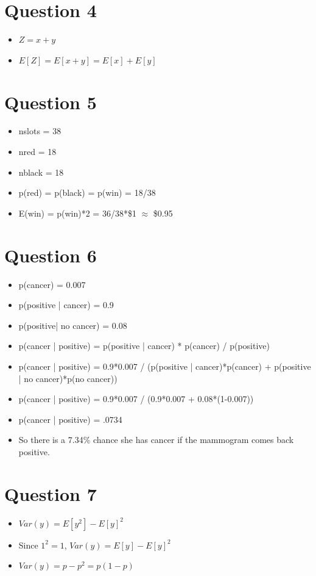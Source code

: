 \documentclass[12pt, letter]{article}
\begin{document}
\section{Question 4}%
\label{sec:question_4}
\begin{itemize}
	\item $Z = x+y$
	\item $E[Z] = E[x+y] = E[x]+E[y]$
\end{itemize}

\section{Question 5}%
\label{sec:question_5}
\begin{itemize}
	\item nslots = 38
	\item nred = 18
	\item nblack = 18
	\item p(red) = p(black) = p(win) = 18/38
	\item E(win) = p(win)*2 = 36/38*\$1 $\approx$ \$0.95
\end{itemize}

\section{Question 6}%
\label{sec:question_6}
\begin{itemize}
	\item p(cancer) = 0.007
	\item p(positive | cancer) = 0.9
	\item p(positive| no cancer) = 0.08
	\item p(cancer | positive) = p(positive | cancer) * p(cancer) / p(positive)
	\item p(cancer | positive) =  0.9*0.007 / (p(positive | cancer)*p(cancer) + p(positive | no cancer)*p(no cancer))
	\item p(cancer | positive) = 0.9*0.007 / (0.9*0.007 + 0.08*(1-0.007))
	\item p(cancer | positive) = .0734
	\item So there is a 7.34\% chance she has cancer if the mammogram comes back positive.
\end{itemize}

\section{Question 7}%
\label{sec:question_7}
\begin{itemize}
	\item $Var(y) = E[y^2]-E[y]^2$
	\item Since $1^2=1$, $Var(y) = E[y]-E[y]^2$
	\item $Var(y) = p-p^2 = p(1-p)$
\end{itemize}
\end{document}
